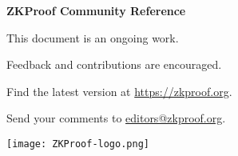 \label{prelim:cover}
\begin{center}
\vspace*{5em}
{\bfseries\Huge ZKProof Community Reference}


\vspace{1em} \scalebox{1.15}{Version 0.2}


\vspace{2em}
\todayext


\vfill
This document is an ongoing work.

Feedback and contributions are encouraged.

Find the latest version at \url{https://zkproof.org}.

Send your comments to \href{mailto:editors@zkproof.org}{editors@zkproof.org}.

\vfill

\texttt{[image: ZKProof-logo.png]}

\vspace{3em}

\end{center}
